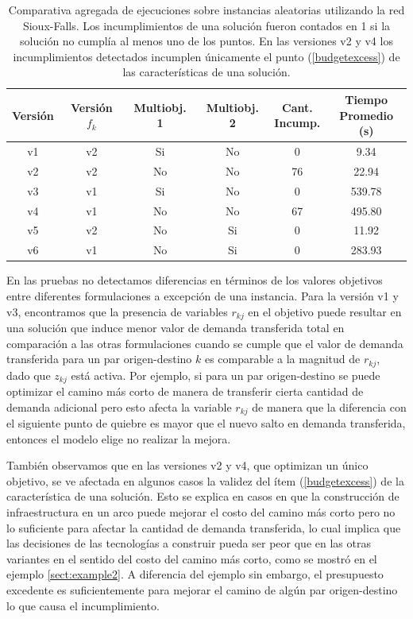 \begin{table}[h!]
  \centering
  \begin{tabular}{cccccc}
    \toprule
    Versión & Versión $f_k$ & Multiobj. 1 & Multiobj. 2 & \shortstack{Cant. \\ Incump.} & \shortstack{Tiempo \\ Promedio (s)} \\
    \midrule
    v1 & v2 & Si & No & 0   & 9.34    \\
    v2 & v2 & No & No & 76  & 22.94   \\
    v3 & v1 & Si & No & 0   & 539.78  \\
    v4 & v1 & No & No & 67  & 495.80  \\
    v5 & v2 & No & Si & 0   & 11.92   \\
    v6 & v1 & No & Si & 0   & 283.93  \\
    \bottomrule
  \end{tabular}
  \caption{Comparativa agregada de ejecuciones sobre instancias aleatorias utilizando la red Sioux-Falls. Los incumplimientos de una solución fueron contados en 1 si la solución no cumplía al menos uno de los puntos. En las versiones v2 y v4 los incumplimientos detectados incumplen únicamente el punto (\ref{budgetexcess}) de las características de una solución.}\label{table:resumenejecuciones}
\end{table}

En las pruebas no detectamos diferencias en términos de los valores objetivos entre diferentes formulaciones a excepción de una instancia. Para la versión v1 y v3, encontramos que la presencia de variables $r_{kj}$ en el objetivo puede resultar en una solución que induce menor valor de demanda transferida total en comparación a las otras formulaciones cuando se cumple que el valor de demanda transferida para un par origen-destino $k$ es comparable a la magnitud de $r_{kj}$, dado que $z_{kj}$ está activa. Por ejemplo, si para un par origen-destino se puede optimizar el camino más corto de manera de transferir cierta cantidad de demanda adicional pero esto afecta la variable $r_{kj}$ de manera que la diferencia con el siguiente punto de quiebre es mayor que el nuevo salto en demanda transferida, entonces el modelo elige no realizar la mejora.

También observamos que en las versiones v2 y v4, que optimizan un único objetivo, se ve afectada en algunos casos la validez del ítem (\ref{budgetexcess}) de la característica de una solución. Esto se explica en casos en que la construcción de infraestructura en un arco puede mejorar el costo del camino más corto pero no lo suficiente para afectar la cantidad de demanda transferida, lo cual implica que las decisiones de las tecnologías a construir pueda ser peor que en las otras variantes en el sentido del costo del camino más corto, como se mostró en el ejemplo \ref{sect:example2}. A diferencia del ejemplo sin embargo, el presupuesto excedente es suficientemente para mejorar el camino de algún par origen-destino lo que causa el incumplimiento.

